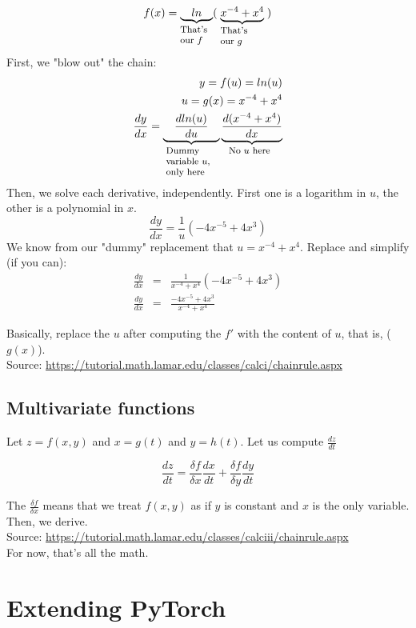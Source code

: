 \documentclass{article}
\newcommand{\explain}[2]{\underbrace{{#1}}_{\parbox{\widthof{\ensuremath{#1}}}{\footnotesize\raggedright #2}}}
\begin{document}
\begin{equation}
	f(x) = \explain{\quad ln \quad}{That's our $f$}(\;\explain{x^{-4} + x^4}{That's our $g$}\;)
\end{equation}
First, we "blow out" the chain:
\begin{eqnarray}
	y = f(u) = ln(u) \\
	u = g(x) = x^{-4} + x^4 \\
	\frac{dy}{dx} = \explain{\quad\frac{d ln(u)}{d u}\quad}{Dummy variable $u$, only here}\explain{\frac{d(x^{-4} + x^4)}{dx}}{No $u$ here}
\end{eqnarray}
Then, we solve each derivative, independently. First one is a logarithm in $u$, the other is a polynomial in $x$.
\begin{equation}
	\frac{dy}{dx} = \frac{1}{u}(-4x^{-5} + 4x^3) 
\end{equation}
We know from our "dummy" replacement that $u=x^{-4} + x^4$. Replace and simplify (if you can):
\begin{eqnarray}
	\frac{dy}{dx}&=&\frac{1}{x^{-4} + x^4}(-4x^{-5} + 4x^3) \\
	\frac{dy}{dx}&=&\frac{-4x^{-5} + 4x^3}{x^{-4} + x^4} 
\end{eqnarray}

Basically, replace the $u$ after computing the $f'$ with the content of $u$, that is, ($g(x)$). \\

Source: \url{https://tutorial.math.lamar.edu/classes/calci/chainrule.aspx}

\subsection{Multivariate functions}
Let $z = f(x,y)$ and $x=g(t)$ and $y = h(t)$. Let us compute $\frac{dz}{dt}$

\begin{equation}
	\frac{dz}{dt} = \frac{\delta f}{\delta x}\frac{dx}{dt} + \frac{\delta f}{\delta y}\frac{dy}{dt}
\end{equation}

The $\frac{\delta f}{\delta x}$ means that we treat $f(x,y)$ as if $y$ is constant and $x$ is the only variable. Then, we derive.
\\
Source: \url{https://tutorial.math.lamar.edu/classes/calciii/chainrule.aspx}\\

For now, that's all the math.


\section{Extending PyTorch}
\end{document}

